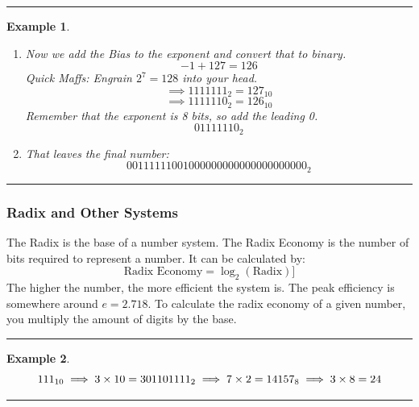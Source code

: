 \documentclass[12pt]{article}
\newtheorem{example}{Example}
\newenvironment{examp}
{
    \vspace{0.5cm}
    \hrule
    \begin{example}\upshape
}
{
    \end{example}
    \hrule
    \vspace{0.5cm}
}
\begin{document}
\begin{examp}
\begin{enumerate}
		      The fraction portion of the standard is 23 bits long for a single
		      precision number. So our last 23 bits are:
		      \[
			      010 0000 0000 0000 0000 0000
		      \]
		\item Now we add the Bias to the exponent and convert that to binary.
		      \[
			      -1 + 127 = 126
		      \]
		      \textit{Quick Maffs:}
		      Engrain \(2^7 = 128\) into your head.
		      \[
			      \implies 1111111_2 = 127_{10}
		      \]
		      \[
			      \implies 1111110_2 = 126_{10}
		      \]
		      Remember that the exponent is 8 bits, so add the leading 0.
		      \[
			      01111110_2
		      \]
		\item That leaves the final number:
		      \[
			      0 01111110 010 0000 0000 0000 0000 0000_2
		      \]
	\end{enumerate}

\end{examp}
\subsubsection{Radix and Other Systems}
The Radix is the base of a number system. The Radix Economy is the number of
bits required to represent a number. It can be calculated by:
\[
	\text{Radix Economy} = \log_2(\text{Radix})]
\]
The higher the number, the more efficient the system is. The peak efficiency is
somewhere around \(e = 2.718\).
To calculate the radix economy of a given number, you multiply the amount
of digits by the base.
\begin{examp}
	\[
		111_{10} \implies 3 \times 10 = 30\\
		1101111_2 \implies 7 \times 2 = 14\\
		157_8 \implies 3 \times 8 = 24\\
	\]
\end{examp}
\end{document}
